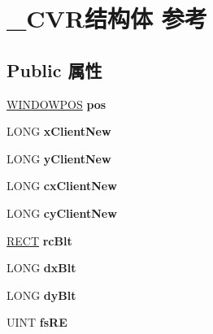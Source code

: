 \hypertarget{struct___c_v_r}{}\section{\+\_\+\+C\+V\+R结构体 参考}
\label{struct___c_v_r}
\subsection*{Public 属性}
\begin{DoxyCompactItemize}
\item 
\mbox{\label{struct___c_v_r_a595a8ff5564c9e101d2b2ac51f3717a3}} 
\hyperlink{struct___w_i_n_d_o_w_p_o_s}{W\+I\+N\+D\+O\+W\+P\+OS} {\bfseries pos}
\item 
\mbox{\label{struct___c_v_r_a79ad213efd6bac5162942426805fb04f}} 
L\+O\+NG {\bfseries x\+Client\+New}
\item 
\mbox{\label{struct___c_v_r_ad8d218ff53d1cb567bf21682d086b2e4}} 
L\+O\+NG {\bfseries y\+Client\+New}
\item 
\mbox{\label{struct___c_v_r_a6c930ec47d17232148229d5ba635774c}} 
L\+O\+NG {\bfseries cx\+Client\+New}
\item 
\mbox{\label{struct___c_v_r_a701a52d68bf608855c57c15981835b74}} 
L\+O\+NG {\bfseries cy\+Client\+New}
\item 
\mbox{\label{struct___c_v_r_a6ec3c7d913655c0c32b9c18fb315f954}} 
\hyperlink{structtag_r_e_c_t}{R\+E\+CT} {\bfseries rc\+Blt}
\item 
\mbox{\label{struct___c_v_r_a0f4a359b815037e0d2880fcb1fa16017}} 
L\+O\+NG {\bfseries dx\+Blt}
\item 
\mbox{\label{struct___c_v_r_acf1542dd40e9c80c32bc6f4e8642ca12}} 
L\+O\+NG {\bfseries dy\+Blt}
\item 
\mbox{\label{struct___c_v_r_a14198064d560ed09ef0145647521a929}} 
U\+I\+NT {\bfseries fs\+RE}
\item 
\mbox{\label{struct___c_v_r_a53e747a82944aae903db5d3eccbd7431}} 

\end{DoxyCompactItemize}
